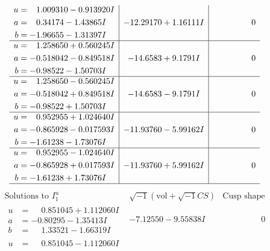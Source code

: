 \documentclass[1p]{elsarticle_modified}
\theoremstyle{definition}
\newcommand{\I}{\sqrt{-1}}
\begin{document}
$$\begin{array}{c|c|c}
\begin{aligned}
u &= \phantom{-}1.009310 - 0.913920 I \\
a &= \phantom{-}0.34174 - 1.43865 I \\
b &= -1.96655 - 1.31397 I\end{aligned}
 & -12.29170 + 1.16111 I & \phantom{-0.000000 } 0 \\ \hline\begin{aligned}
u &= \phantom{-}1.258650 + 0.560245 I \\
a &= -0.518042 - 0.849518 I \\
b &= -0.98522 - 1.50703 I\end{aligned}
 & -14.6583 + 9.1791 I & \phantom{-0.000000 } 0 \\ \hline\begin{aligned}
u &= \phantom{-}1.258650 - 0.560245 I \\
a &= -0.518042 + 0.849518 I \\
b &= -0.98522 + 1.50703 I\end{aligned}
 & -14.6583 - 9.1791 I & \phantom{-0.000000 } 0 \\ \hline\begin{aligned}
u &= \phantom{-}0.952955 + 1.024640 I \\
a &= -0.865928 - 0.017593 I \\
b &= -1.61238 - 1.73076 I\end{aligned}
 & -11.93760 - 5.99162 I & \phantom{-0.000000 } 0 \\ \hline\begin{aligned}
u &= \phantom{-}0.952955 - 1.024640 I \\
a &= -0.865928 + 0.017593 I \\
b &= -1.61238 + 1.73076 I\end{aligned}
 & -11.93760 + 5.99162 I & \phantom{-0.000000 } 0\\
 \hline 
 \end{array}$$\newpage$$\begin{array}{c|c|c}  
\text{Solutions to }I^u_{1}& \I (\text{vol} + \sqrt{-1}CS) & \text{Cusp shape}\\
 \hline 
\begin{aligned}
u &= \phantom{-}0.851045 + 1.112060 I \\
a &= -0.80295 - 1.35413 I \\
b &= \phantom{-}1.33521 - 1.66319 I\end{aligned}
 & -7.12550 - 9.55838 I & \phantom{-0.000000 } 0 \\ \hline\begin{aligned}
u &= \phantom{-}0.851045 - 1.112060 I \\

\end{aligned}
\end{array}$$
\end{document}

